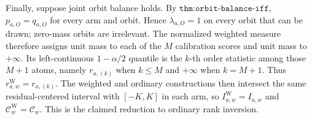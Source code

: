 Finally, suppose joint orbit balance holds. By \(\texttt{thm:orbit-balance-iff}\), \(p_{a,O}=q_{a,O}\) for every arm and orbit. Hence \(\lambda_{a,O}=1\) on every orbit that can be drawn; zero-mass orbits are irrelevant. The normalized weighted measure therefore assigns unit mass to each of the \(M\) calibration scores and unit mass to \(+\infty\). Its left-continuous \(1-\alpha/2\) quantile is the \(k\)-th order statistic among those \(M+1\) atoms, namely \(r_{a,(k)}\) when \(k\le M\) and \(+\infty\) when \(k=M+1\). Thus \(r^{\mathrm W}_{a,w}=r_{a,(k)}\). The weighted and ordinary constructions then intersect the same residual-centered interval with \([-K,K]\) in each arm, so \(I^{\mathrm W}_{a,w}=I_{a,w}\) and \(\mathcal C^{\mathrm W}_w=\mathcal C_w\). This is the claimed reduction to ordinary rank inversion.